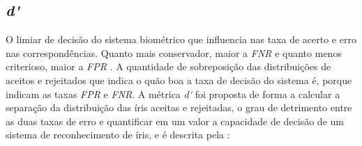 
\FloatBarrier

\subsection{\textit{\acrfull{d'}}}\label{sec:experimentos:daugman}

\par O limiar de decisão do sistema biométrico que influencia nas taxa de acerto e erro nas correspondências. Quanto mais conservador, maior a \textit{\acrshort{FNR}} e quanto menos criterioso, maior a \textit{\acrshort{FPR}} \cite{daugman2000}. A quantidade de sobreposição das distribuições de aceitos e rejeitados que indica o quão boa a taxa de decisão do sistema é, porque indicam as taxas \textit{\acrshort{FPR}} e \textit{\acrshort{FNR}}. A métrica \textit{\acrshort{d'}} foi proposta de forma a calcular a separação da distribuição das íris aceitas e rejeitadas, o grau de detrimento entre as duas taxas de erro e quantificar em um valor a capacidade de decisão de um sistema de reconhecimento de íris, e é descrita pela  \cite{daugman2000}:

